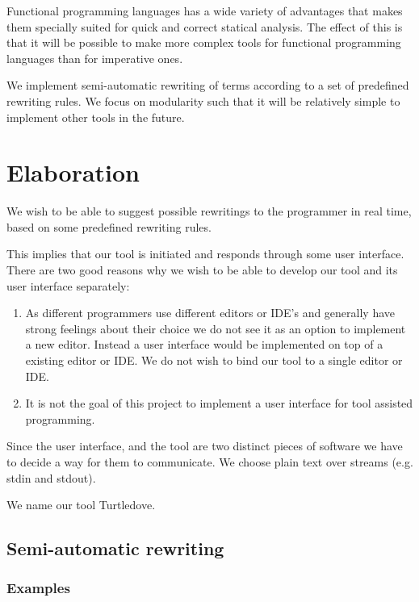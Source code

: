 \documentclass[a4paper,oneside]{article}
\begin{document}
Functional programming languages has a wide variety of advantages that makes them specially suited
for quick and correct statical analysis. The effect of this is that it will be possible to make more
complex tools for functional programming languages than for imperative ones.

We implement semi-automatic rewriting of terms according to a set of predefined rewriting rules. We
focus on modularity such that it will be relatively simple to implement other tools in the
future. 

\section{Elaboration}
We wish to be able to suggest possible rewritings to the programmer in real time, based on some
predefined rewriting rules.

This implies that our tool is initiated and responds through some user interface. There are two good
reasons why we wish to be able to develop our tool and its user interface separately:
\begin{enumerate}
\item As different programmers use different editors or IDE's and generally have strong feelings
      about their choice we do not see it as an option to implement a new editor. Instead a user
      interface would be implemented on top of a existing editor or IDE. We do not wish to bind our
      tool to a single editor or IDE.
\item It is not the goal of this project to implement a user interface for tool assisted
      programming.
\end{enumerate}

Since the user interface, and the tool are two distinct pieces of software we have to decide a way
for them to communicate. We choose plain text over streams (e.g. stdin and stdout).

We name our tool Turtledove.

\subsection{Semi-automatic rewriting}

\subsubsection{Examples}
\end{document}
